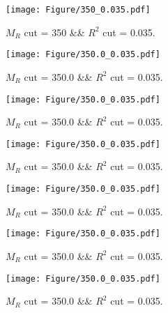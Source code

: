  
\begin{figure}[H] 
\begin{center} 
\texttt{[image: Figure/350\_0.035.pdf]} 
\caption{$M_R$ cut = 350 \&\& $R^2$ cut = 0.035.} 
\label{Fig:350_0.035} 
\end{center} 
\end{figure} 
 
 
\begin{figure}[H] 
\begin{center} 
\texttt{[image: Figure/350.0\_0.035.pdf]} 
\caption{$M_R$ cut = 350.0 \&\& $R^2$ cut = 0.035.} 
\label{Fig:350.0_0.035} 
\end{center} 
\end{figure} 
 
 
\begin{figure}[H] 
\begin{center} 
\texttt{[image: Figure/350.0\_0.035.pdf]} 
\caption{$M_R$ cut = 350.0 \&\& $R^2$ cut = 0.035.} 
\label{Fig:350.0_0.035} 
\end{center} 
\end{figure} 
 
 
\begin{figure}[H] 
\begin{center} 
\texttt{[image: Figure/350.0\_0.035.pdf]} 
\caption{$M_R$ cut = 350.0 \&\& $R^2$ cut = 0.035.} 
\label{Fig:350.0_0.035} 
\end{center} 
\end{figure} 
 
 
\begin{figure}[H] 
\begin{center} 
\texttt{[image: Figure/350.0\_0.035.pdf]} 
\caption{$M_R$ cut = 350.0 \&\& $R^2$ cut = 0.035.} 
\label{Fig:350.0_0.035} 
\end{center} 
\end{figure} 
 
 
\begin{figure}[H] 
\begin{center} 
\texttt{[image: Figure/350.0\_0.035.pdf]} 
\caption{$M_R$ cut = 350.0 \&\& $R^2$ cut = 0.035.} 
\label{Fig:350.0_0.035} 
\end{center} 
\end{figure} 
 
 
\begin{figure}[H] 
\begin{center} 
\texttt{[image: Figure/350.0\_0.035.pdf]} 
\caption{$M_R$ cut = 350.0 \&\& $R^2$ cut = 0.035.} 
\label{Fig:350.0_0.035} 
\end{center} 
\end{figure} 
 
